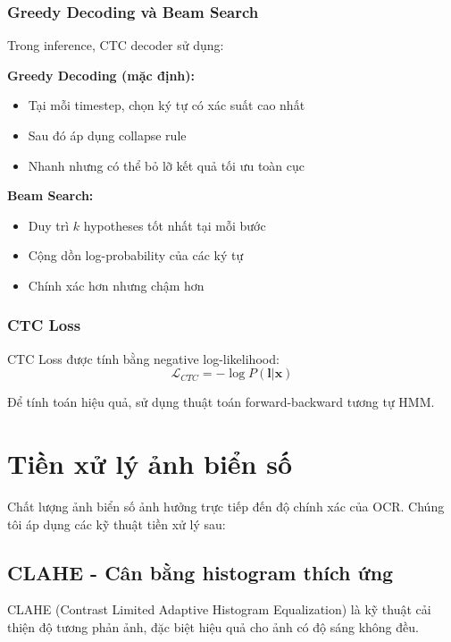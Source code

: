 \subsubsection{Greedy Decoding và Beam Search}
Trong inference, CTC decoder sử dụng:

\textbf{Greedy Decoding (mặc định):}
\begin{itemize}
    \item Tại mỗi timestep, chọn ký tự có xác suất cao nhất
    \item Sau đó áp dụng collapse rule
    \item Nhanh nhưng có thể bỏ lỡ kết quả tối ưu toàn cục
\end{itemize}

\textbf{Beam Search:}
\begin{itemize}
    \item Duy trì $k$ hypotheses tốt nhất tại mỗi bước
    \item Cộng dồn log-probability của các ký tự
    \item Chính xác hơn nhưng chậm hơn
\end{itemize}

\subsubsection{CTC Loss}
CTC Loss được tính bằng negative log-likelihood:
\begin{equation}
    \mathcal{L}_{CTC} = -\log P(\mathbf{l} | \mathbf{x})
\end{equation}

Để tính toán hiệu quả, sử dụng thuật toán forward-backward tương tự HMM.

\section{Tiền xử lý ảnh biển số}

Chất lượng ảnh biển số ảnh hưởng trực tiếp đến độ chính xác của OCR. Chúng tôi áp dụng các kỹ thuật tiền xử lý sau:

\subsection{CLAHE - Cân bằng histogram thích ứng}
CLAHE (Contrast Limited Adaptive Histogram Equalization) là kỹ thuật cải thiện độ tương phản ảnh, đặc biệt hiệu quả cho ảnh có độ sáng không đều.

